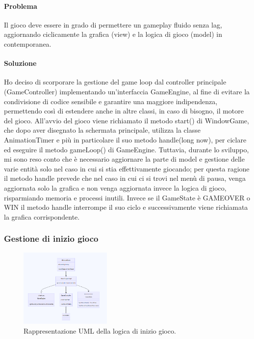\documentclass[a4paper,12pt]{report}
\begin{document}
\paragraph{Problema} Il gioco deve essere in grado di permettere un gameplay fluido senza lag, aggiornando ciclicamente la grafica (view) e la logica di gioco (model) in contemporanea.

\paragraph{Soluzione} Ho deciso di scorporare la gestione del game loop dal controller principale (GameController) implementando un’interfaccia GameEngine, al fine di evitare la condivisione di codice sensibile e garantire una maggiore indipendenza, permettendo così di estendere anche in altre classi, in caso di bisogno, il motore del gioco. All'avvio del gioco viene richiamato il metodo start() di WindowGame, che dopo aver disegnato la schermata principale, utilizza la classe AnimationTimer e più in particolare il suo metodo handle(long now), per ciclare ed eseguire il metodo gameLoop() di GameEngine. Tuttavia, durante lo sviluppo, mi sono reso conto che è necessario aggiornare la parte di model e gestione delle varie entità solo nel caso in cui si stia effettivamente giocando; per questa ragione il metodo handle prevede che nel caso in cui ci si trovi nel menù di pausa, venga aggiornata solo la grafica e non venga aggiornata invece la logica di gioco, risparmiando memoria e processi inutili. Invece se il GameState è GAMEOVER o WIN il metodo handle interrompe il suo ciclo e successivamente viene richiamata la grafica corrispondente. 

\subsubsection{Gestione di inizio gioco}

\begin{figure}[H]
\centering{}
\includegraphics[width=0.4\textwidth]{img/Inizio Gioco.png}
\caption{Rappresentazione UML della logica di inizio gioco.}
\end{figure}
\end{document}
